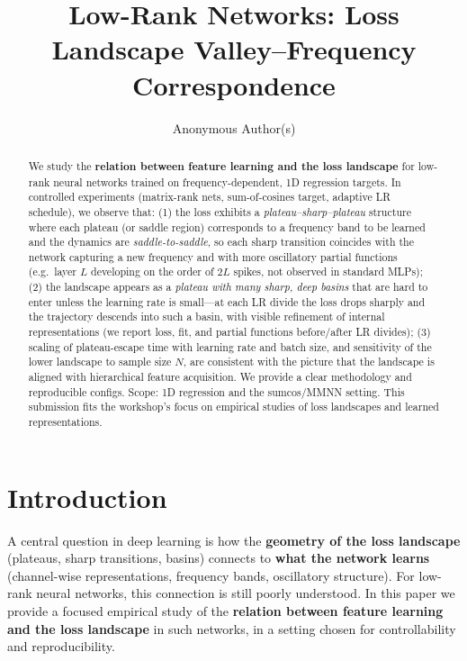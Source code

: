 \documentclass{article}
\title{Low-Rank Networks: Loss Landscape Valley--Frequency Correspondence}
\author{Anonymous Author(s)
}
\begin{document}
\maketitle

\begin{abstract}
We study the \textbf{relation between feature learning and the loss landscape} for low-rank neural networks trained on frequency-dependent, 1D regression targets. In controlled experiments (matrix-rank nets, sum-of-cosines target, adaptive LR schedule), we observe that: (1) the loss exhibits a \emph{plateau--sharp--plateau} structure where each plateau (or saddle region) corresponds to a frequency band to be learned and the dynamics are \emph{saddle-to-saddle}, so each sharp transition coincides with the network capturing a new frequency and with more oscillatory partial functions (e.g.\ layer $L$ developing on the order of $2L$ spikes, not observed in standard MLPs); (2) the landscape appears as a \emph{plateau with many sharp, deep basins} that are hard to enter unless the learning rate is small---at each LR divide the loss drops sharply and the trajectory descends into such a basin, with visible refinement of internal representations (we report loss, fit, and partial functions before/after LR divides); (3) scaling of plateau-escape time with learning rate and batch size, and sensitivity of the lower landscape to sample size $N$, are consistent with the picture that the landscape is aligned with hierarchical feature acquisition. We provide a clear methodology and reproducible configs. Scope: 1D regression and the sumcos/MMNN setting. This submission fits the workshop's focus on empirical studies of loss landscapes and learned representations.
\end{abstract}

\section{Introduction}
\label{sec:intro}

A central question in deep learning is how the \textbf{geometry of the loss landscape} (plateaus, sharp transitions, basins) connects to \textbf{what the network learns} (channel-wise representations, frequency bands, oscillatory structure). For low-rank neural networks, this connection is still poorly understood. In this paper we provide a focused empirical study of the \textbf{relation between feature learning and the loss landscape} in such networks, in a setting chosen for controllability and reproducibility.
\end{document}
